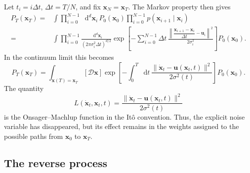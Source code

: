 \documentclass[11pt]{article}
\newcommand{\vct}[1]{\bm{#1}}
\newcommand{\dd}{\mathop{}\!\mathrm{d}}
\begin{document}
Let \(t_i=i\Delta t\), \(\Delta t=T/N\), and fix \(\vct{x}_N=\vct{x}_T\).
The Markov property then gives
\begin{align}
    P_T(\vct{x}_T)
    ={}&\int\prod_{i=0}^{N-1}\dd^d\vct{x}_i\,P_0(\vct{x}_0)
    \prod_{i=0}^{N-1}p(\vct{x}_{i+1}\mid\vct{x}_i)
    \nonumber\\
    ={}&\int\prod_{i=0}^{N-1}
    \frac{\dd^d\vct{x}_i}{(2\pi\sigma_i^2\Delta t)^{d/2}}
    \exp\!\left[-\sum_{i=0}^{N-1}\Delta t\,
    \frac{\left\lVert
    \dfrac{\vct{x}_{i+1}-\vct{x}_i}{\Delta t}-\vct{u}_i
    \right\rVert^2}{2\sigma_i^2}\right]P_0(\vct{x}_0).
    \label{eq:discrete-path-integral}
\end{align}
In the continuum limit this becomes
\begin{equation}
    P_T(\vct{x}_T)
    =\int_{\vct{x}(T)=\vct{x}_T}[\mathcal{D}\vct{x}]
    \exp\!\left[-\int_0^T\dd t\,
    \frac{\lVert\dot{\vct{x}}_t-\vct{u}(\vct{x}_t,t)\rVert^2}
    {2\sigma^2(t)}\right]P_0(\vct{x}_0).
    \label{eq:forward-path-integral}
\end{equation}
The quantity
\begin{equation}
    L(\dot{\vct{x}}_t,\vct{x}_t,t)
    =\frac{\lVert\dot{\vct{x}}_t-\vct{u}(\vct{x}_t,t)\rVert^2}
    {2\sigma^2(t)}
\end{equation}
is the Onsager--Machlup function in the It\^{o} convention. Thus, the explicit
noise variable has disappeared, but its effect remains in the weights assigned
to the possible paths from \(\vct{x}_0\) to \(\vct{x}_T\).

\subsection{The reverse process}
\end{document}
